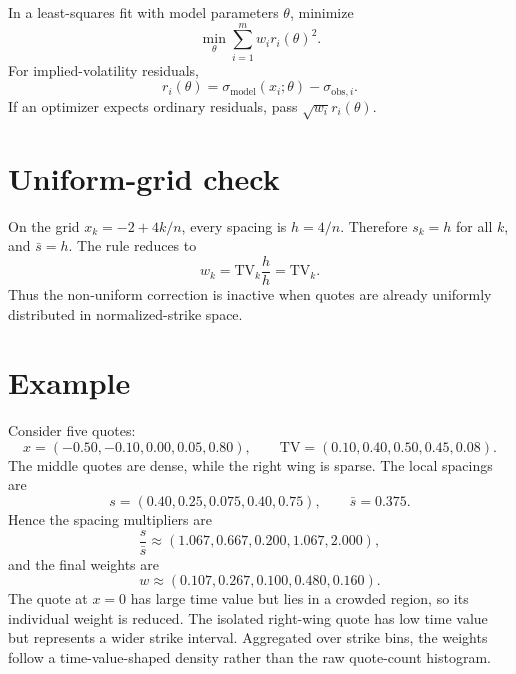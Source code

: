 \documentclass[9pt,a4paper]{extarticle}
\begin{document}
In a least-squares fit with model parameters $\theta$, minimize
\[
  \min_\theta \sum_{i=1}^m w_i r_i(\theta)^2.
\]
For implied-volatility residuals,
\[
  r_i(\theta)=\sigma_{\mathrm{model}}(x_i;\theta)-\sigma_{\mathrm{obs},i}.
\]
If an optimizer expects ordinary residuals, pass $\sqrt{w_i}r_i(\theta)$.

\section*{Uniform-grid check}
On the grid $x_k=-2+4k/n$, every spacing is $h=4/n$. Therefore $s_k=h$ for all $k$, and $\bar{s}=h$. The rule reduces to
\[
  w_k=\mathrm{TV}_k\frac{h}{h}=\mathrm{TV}_k.
\]
Thus the non-uniform correction is inactive when quotes are already uniformly distributed in normalized-strike space.

\section*{Example}
Consider five quotes:
\[
  x=(-0.50,-0.10,0.00,0.05,0.80),\qquad
  \mathrm{TV}=(0.10,0.40,0.50,0.45,0.08).
\]
The middle quotes are dense, while the right wing is sparse. The local spacings are
\[
  s=(0.40,0.25,0.075,0.40,0.75),\qquad \bar{s}=0.375.
\]
Hence the spacing multipliers are
\[
  \frac{s}{\bar{s}}\approx(1.067,0.667,0.200,1.067,2.000),
\]
and the final weights are
\[
  w\approx(0.107,0.267,0.100,0.480,0.160).
\]
The quote at $x=0$ has large time value but lies in a crowded region, so its individual weight is reduced. The isolated right-wing quote has low time value but represents a wider strike interval. Aggregated over strike bins, the weights follow a time-value-shaped density rather than the raw quote-count histogram.
\end{document}

